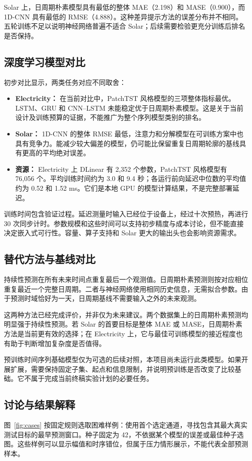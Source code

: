 \documentclass[12pt,a4paper,UTF8]{ctexart}
\begin{document}
Solar 上，日周期朴素模型具有最低的整体 MAE（2.198）和 MASE（0.900），而 1D-CNN 具有最低的 RMSE（4.888）。这种差异提示方法的误差分布并不相同。五轮训练不足以说明神经网络普遍不适合 Solar；后续需要检验更充分训练后排名是否保持。

\FloatBarrier
\subsection{深度学习模型对比}
初步对比显示，两类任务对应不同取舍：
\begin{itemize}
\item \textbf{Electricity：} 在当前对比中，PatchTST 风格模型的三项整体指标最优。LSTM、GRU 和 CNN--LSTM 未能稳定优于日周期朴素模型。这是关于当前设计及训练预算的证据，不能推广为整个序列模型类别的排名。
\item \textbf{Solar：} 1D-CNN 的整体 RMSE 最低，注意力和分解模型在可训练方案中也具有竞争力。能减少较大偏差的模型，仍可能比保留重复日周期轮廓的基线具有更高的平均绝对误差。
\item \textbf{资源：} Electricity 上 DLinear 有 2,352 个参数，PatchTST 风格模型有 76,056 个。平均训练时间约为 3.0 和 9.4 秒；各运行前向延迟中位数的平均值约为 0.52 和 1.52 ms。它们是本地 GPU 的模型计算结果，不是完整部署延迟。
\end{itemize}
训练时间包含验证过程。延迟测量时输入已经位于设备上，经过十次预热，再进行 30 次同步计时。参数规模和这些时间可以支持初步精度与成本讨论，但不能直接决定嵌入式可行性。容量、算子支持和 Solar 更大的输出头也会影响资源需求。

\subsection{替代方法与基线对比}\label{sec:alternatives}
持续性预测在所有未来时间点重复最后一个观测值。日周期朴素预测则按对应相位重复最近一个完整日周期。二者与神经网络使用相同历史信息，无需拟合参数。由于预测时域恰好为一天，日周期基线不需要输入之外的未来观测。

这两种方法已经完成评价，并非仅为未来建议。两个数据集上的日周期朴素预测均明显强于持续性预测。若 Solar 的首要目标是整体 MAE 或 MASE，日周期朴素方法是当前更有效的选择；在 Electricity 上，它与最佳可训练模型的接近程度也有助于判断增加复杂度是否值得。

预训练时间序列基础模型仅为可选的后续对照，本项目尚未运行此类模型。如果开展扩展，需要保持固定子集、起点和信息限制，并说明预训练是否改变了比较基础。它不属于完成当前终稿实验计划的必要任务。

\subsection{讨论与结果解释}
图~\ref{fig:cases} 按固定规则选取困难样例：使用首个选定通道，寻找包含其最大真实测试目标的最早预测窗口。种子固定为 42，不依据某个模型的误差或最佳种子选图。这些样例可以显示幅值和时序错位，但属于压力情形展示，不能代表全部预测样本。
\end{document}
